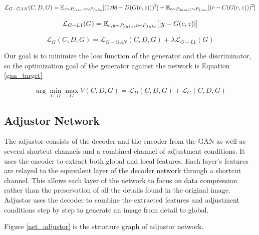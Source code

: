 \begin{equation}
    \mathcal{L}_{G-GAN}(C,D,G)=
    \mathbb{E}_{c\thicksim P_{data},z\thicksim P_{fake}}[(0.98-D(G(c,z)))^2]+
    \mathbb{E}_{c\thicksim P_{data},z\thicksim P_{fake}}[(c-C(G(c,z)))^2]
    \label{loss_g_gan}
\end{equation}

\begin{equation}
    \mathcal{L}_{G-L1}(G)=
    \mathbb{E}_{c,y\thicksim P_{data},z\thicksim P_{fake}}[|y-G(c,z)|]
    \label{loss_g_l1}
\end{equation}

\begin{equation}
    \mathcal{L}_{G}(C,D,G)=
    \mathcal{L}_{G-GAN}(C,D,G)+
    \lambda \mathcal{L}_{G-L1}(G)
    \label{loss_g}
\end{equation}

Our goal is to minimize the loss function of the generator and the discriminator,
    so the optimization goal of the generator against the network is Equation \eqref{gan_target}

\begin{equation}
    \arg \min_{C,D} \max_{G}V(C,D,G)=\mathcal{L}_{D}(C,D,G)+\mathcal{L}_{G}(C,D,G)
    \label{gan_target}
\end{equation}


\subsection{Adjustor Network}
The adjustor consists of the decoder and the encoder from the GAN as well as several shortcut channels and a combined channel of adjustment conditions.
It uses the encoder to extract both global and local features.
Each layer’s features are relayed to the equivalent layer of the decoder network through a shortcut channel.
This allows each layer of the network to focus on data compression rather than the preservation of all the details found in the original image.
Adjustor uses the decoder to combine the extracted features and adjustment conditions step by step to generate an image from detail to global.

Figure \ref{net_adjustor} is the structure graph of adjustor network.

